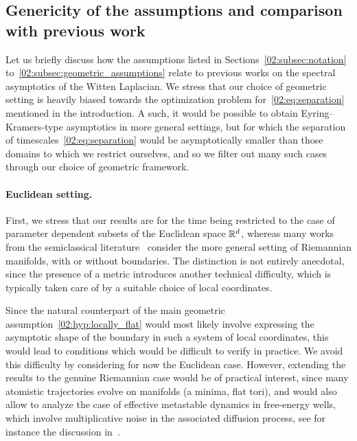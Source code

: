     \subsection{Genericity of the assumptions and comparison with previous work}
    \label{02:subsec:genericity}
    Let us briefly discuss how the assumptions listed in Sections~\ref{02:subsec:notation} to~\ref{02:subsec:geometric_assumptions} relate to previous works on the spectral asymptotics of the Witten Laplacian.
    We stress that our choice of geometric setting is heavily biased towards the optimization problem for~\eqref{02:eq:separation} mentioned in the introduction. A such, it would be possible to obtain Eyring--Kramers-type asymptotics in more general settings, but for which the separation of timescales~\eqref{02:eq:separation} would be asymptotically smaller than those domains to which we restrict ourselves, and so we filter out many such cases through our choice of geometric framework.

    \paragraph{Euclidean setting.} First, we stress that our results are for the time being restricted to the case of parameter dependent subsets of the Euclidean space $\mathbb{R}^d$, whereas many works from the semiclassical literature~\cite{HKN04,LP10,LN15,LPN21,DGLLPN19} consider the more general setting of Riemannian manifolds, with or without boundaries.
    The distinction is not entirely anecdotal, since the presence of a metric introduces another technical difficulty, which is typically taken care of by a suitable choice of local coordinates.

    Since the natural counterpart of the main geometric assumption~\eqref{02:hyp:locally_flat} would most likely involve expressing the asymptotic shape of the boundary in such a system of local coordinates, this would lead to conditions which would be difficult to verify in practice. We avoid this difficulty by considering for now the Euclidean case. 
    However, extending the results to the genuine Riemannian case would be of practical interest, since many atomistic trajectories evolve on manifolds (a minima, flat tori), and would also allow to analyze the case of effective metastable dynamics in free-energy wells, which involve multiplicative noise in the associated diffusion process, see for instance the discussion in~\cite[Section 2.3]{ZHS16}.

